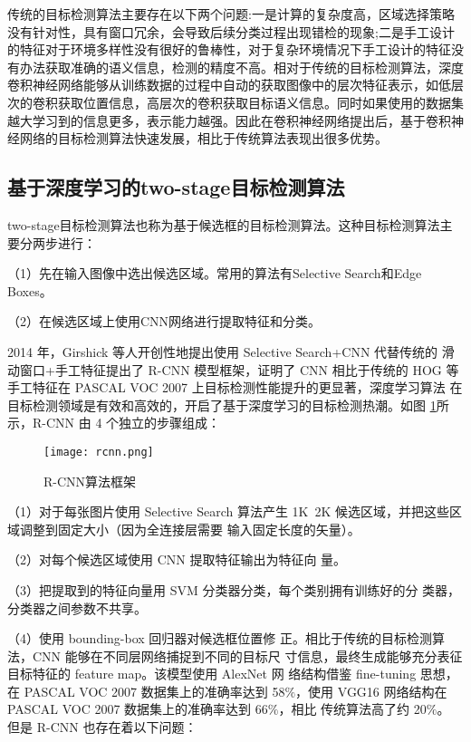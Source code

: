 传统的目标检测算法主要存在以下两个问题:一是计算的复杂度高，区域选择策略没有针对性，具有窗口冗余，会导致后续分类过程出现错检的现象;二是手工设计的特征对于环境多样性没有很好的鲁棒性，对于复杂环境情况下手工设计的特征没有办法获取准确的语义信息，检测的精度不高。相对于传统的目标检测算法，深度卷积神经网络能够从训练数据的过程中自动的获取图像中的层次特征表示，如低层次的卷积获取位置信息，高层次的卷积获取目标语义信息。同时如果使用的数据集越大学习到的信息更多，表示能力越强。因此在卷积神经网络提出后，基于卷积神经网络的目标检测算法快速发展，相比于传统算法表现出很多优势。

\subsection{基于深度学习的two-stage目标检测算法}
two-stage目标检测算法也称为基于候选框的目标检测算法。这种目标检测算法主要分两步进行：

（1）先在输入图像中选出候选区域。常用的算法有Selective Search和Edge Boxes。

（2）在候选区域上使用CNN网络进行提取特征和分类。

2014 年，Girshick 等人开创性地提出使用 Selective Search+CNN 代替传统的
滑动窗口+手工特征提出了 R-CNN 模型框架\cite{girshick2014rich}，证明了 CNN 相比于传统的 HOG
等手工特征在 PASCAL VOC 2007 上目标检测性能提升的更显著，深度学习算法
在目标检测领域是有效和高效的，开启了基于深度学习的目标检测热潮。如图
\ref{rcnn}所示，R-CNN 由 4 个独立的步骤组成：

\begin{figure}[htbp]
    \centering
    \texttt{[image: rcnn.png]}
    \caption{R-CNN算法框架}
    \label{rcnn}
\end{figure}

（1）对于每张图片使用 Selective Search
算法产生 1K~2K 候选区域，并把这些区域调整到固定大小（因为全连接层需要
输入固定长度的矢量）。

（2）对每个候选区域使用 CNN 提取特征输出为特征向
量。

（3）把提取到的特征向量用 SVM 分类器分类，每个类别拥有训练好的分
类器，分类器之间参数不共享。

（4）使用 bounding-box 回归器对候选框位置修
正。相比于传统的目标检测算法，CNN 能够在不同层网络捕捉到不同的目标尺
寸信息，最终生成能够充分表征目标特征的 feature map。该模型使用 AlexNet 网
络结构借鉴 fine-tuning 思想，在 PASCAL VOC 2007 数据集上的准确率达到 58$\%$，使用 VGG16 网络结构在 PASCAL VOC 2007 数据集上的准确率达到 66$\%$，相比
传统算法高了约 20$\%$。
但是 R-CNN 也存在着以下问题：

